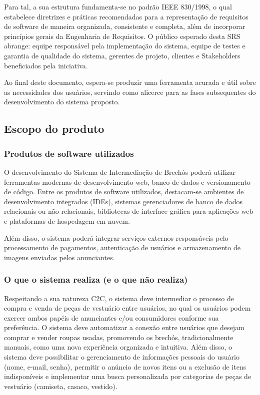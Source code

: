 ﻿\documentclass[12pt,a4paper]{article}
\begin{document}
Para tal, a sua estrutura fundamenta-se no padrão IEEE 830/1998, o qual estabelece diretrizes e práticas recomendadas para a representação de requisitos de software de maneira organizada, consistente e completa, além de incorporar princípios gerais da Engenharia de Requisitos. O público esperado desta SRS abrange: equipe responsável pela implementação do sistema, equipe de testes e garantia de qualidade do sistema, gerentes de projeto, clientes e Stakeholders beneficiados pela iniciativa.

Ao final deste documento, espera-se produzir uma ferramenta acurada e útil sobre as necessidades dos usuários, servindo como alicerce para as fases subsequentes do desenvolvimento do sistema proposto.

\subsection{Escopo do produto}
\label{sec:Escopo}

\subsubsection{Produtos de software utilizados}
\label{sec:Produtos}

O desenvolvimento do Sistema de Intermediação de Brechós poderá utilizar ferramentas modernas de desenvolvimento web, banco de dados e versionamento de código. Entre os produtos de software utilizados, destacam-se ambientes de desenvolvimento integrados (IDEs), sistemas gerenciadores de banco de dados relacionais ou não relacionais, bibliotecas de interface gráfica para aplicações web e plataformas de hospedagem em nuvem.

Além disso, o sistema poderá integrar serviços externos responsáveis pelo processamento de pagamentos, autenticação de usuários e armazenamento de imagens enviadas pelos anunciantes.

\subsubsection{O que o sistema realiza (e o que não realiza)}
\label{sec:SistemaRealiza}

Respeitando a sua natureza C2C, o sistema deve intermediar o processo de compra e venda de peças de vestuário entre usuários, no qual os usuários podem exercer ambos papéis de anunciantes e/ou consumidores conforme sua preferência. O sistema deve automatizar a conexão entre usuários que desejam comprar e vender roupas usadas, promovendo os brechós, tradicionalmente manuais, como uma nova experiência organizada e intuitiva. Além disso, o sistema deve possibilitar o gerenciamento de informações pessoais do usuário (nome, e-mail, senha), permitir o anúncio de novos itens ou a exclusão de itens indisponíveis e implementar uma busca personalizada por categorias de peças de vestuário (camiseta, casaco, vestido).
\end{document}
